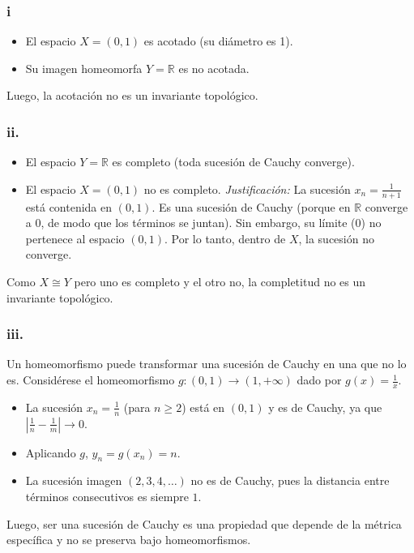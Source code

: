 \documentclass[11pt, a4paper]{article}
\begin{document}
\subsubsection*{i}
\begin{itemize}
    \item El espacio $X = (0, 1)$ es acotado (su diámetro es 1).
    \item Su imagen homeomorfa $Y = \mathbb{R}$ es no acotada.
\end{itemize}
Luego, la acotación no es un invariante topológico.

\subsubsection*{ii.}
\begin{itemize}
    \item El espacio $Y = \mathbb{R}$ es completo (toda sucesión de Cauchy converge).
    \item El espacio $X = (0, 1)$ no es completo.
    \textit{Justificación:} La sucesión $x_n = \frac{1}{n+1}$ está contenida en $(0, 1)$. Es una
    sucesión de Cauchy (porque en $\mathbb{R}$ converge a 0, de modo que los términos se juntan). Sin
    embargo, su límite (0) no pertenece al espacio $(0, 1)$. Por lo tanto, dentro de $X$, la
    sucesión no converge.
\end{itemize}
Como $X \cong Y$ pero uno es completo y el otro no, la completitud no es un invariante topológico.

\subsubsection*{iii.}
Un homeomorfismo puede transformar una sucesión de Cauchy en una que no lo es. Considérese el
homeomorfismo $g: (0, 1) \to (1, +\infty)$ dado por $g(x) = \frac{1}{x}$.

\begin{itemize}
    \item La sucesión $x_n = \frac{1}{n}$ (para $n \ge 2$) está en $(0, 1)$ y es de Cauchy, ya que
    $\left| \frac{1}{n} - \frac{1}{m} \right| \to 0$.
    \item Aplicando $g$, $y_n = g(x_n) = n$.
    \item La sucesión imagen $(2, 3, 4, \dots)$ no es de Cauchy, pues la distancia entre términos
    consecutivos es siempre $1$.
\end{itemize}
Luego, ser una sucesión de Cauchy es una propiedad que depende de la métrica específica y no se
preserva bajo homeomorfismos.
\end{document}
